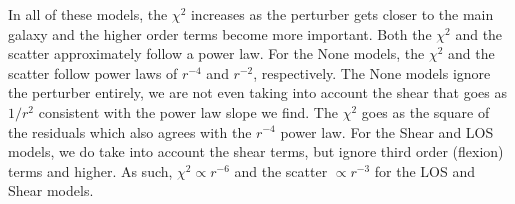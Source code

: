 In all of these models, the $\chi^2$ increases as the perturber gets closer to the main galaxy and the higher order terms become more important. Both the $\chi^2$ and the scatter approximately follow a power law. For the None models, the $\chi^2$ and the scatter follow power laws of $r^{-4}$ and $r^{-2}$, respectively. The None models ignore the perturber entirely, we are not even taking into account the shear that goes as $1/r^2$ consistent with the power law slope we find. The $\chi^2$ goes as the square of the residuals which also agrees with the $r^{-4}$ power law. For the Shear and LOS models, we do take into account the shear terms, but ignore third order (flexion) terms and higher. As such, $\chi^2 \propto r^{-6}$ and the scatter $\propto r^{-3}$ for the LOS and Shear models.